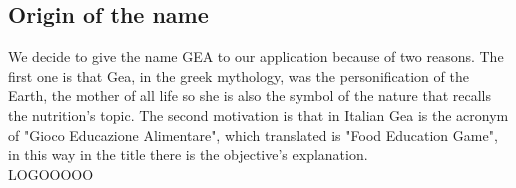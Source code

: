 \subsection{Origin of the name}
We decide to give the name GEA to our application because of two reasons. The first one is that Gea, in the greek mythology, was the personification of the Earth, the mother of all life so she is also the symbol of the nature that recalls the nutrition's topic. The second motivation is that in Italian Gea is the acronym of "Gioco Educazione Alimentare", which translated is "Food Education Game", in this way in the title there is the objective's explanation.\\
LOGOOOOO


